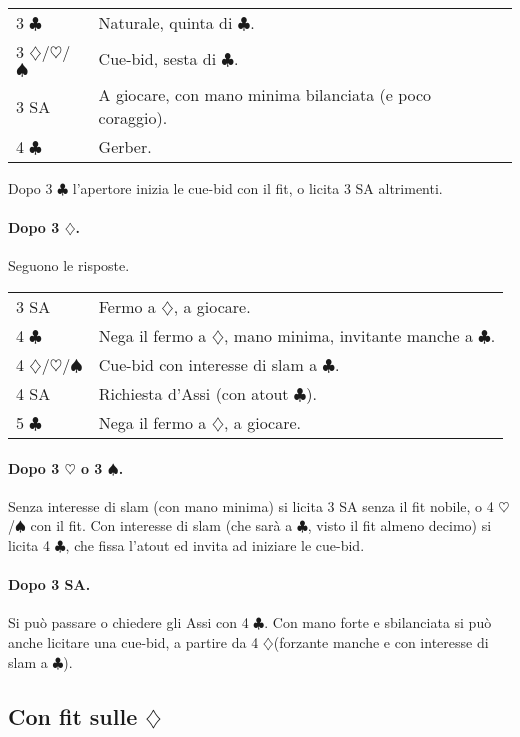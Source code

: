 \documentclass[a4paper,10pt]{article}
\renewcommand{\c}{$\clubsuit$\xspace}
\renewcommand{\d}{$\diamondsuit$\xspace}
\newcommand{\h}{$\heartsuit$\xspace}
\newcommand{\s}{$\spadesuit$\xspace}
\newcommand{\sa}{SA\xspace}
\newcommand{\smallspace}{\vskip0.3cm}
\newenvironment{twocol}
  {\smallspace\noindent\begin{tabular}{l p{0.78\textwidth}}}
  {\end{tabular}\smallspace}
\begin{document}
\begin{twocol}
	3 \c & Naturale, quinta di \c. \\
	3 \d/\h/\s & Cue-bid, sesta di \c. \\
	3 \sa & A giocare, con mano minima bilanciata (e poco coraggio). \\
	4 \c & Gerber.
\end{twocol}

Dopo 3 \c l'apertore inizia le cue-bid con il fit, o licita 3 \sa altrimenti. %

\paragraph{Dopo 3 \d.} Seguono le risposte.

\begin{twocol}
	3 \sa & Fermo a \d, a giocare. \\
	4 \c & Nega il fermo a \d, mano minima, invitante manche a \c. \\
	4 \d/\h/\s & Cue-bid con interesse di slam a \c. \\
	4 \sa & Richiesta d'Assi (con atout \c). \\
	5 \c & Nega il fermo a \d, a giocare.
\end{twocol}

\paragraph{Dopo 3 \h o 3 \s.} Senza interesse di slam (con mano minima) si licita 3 \sa senza il fit nobile, o 4 \h/\s con il fit. Con interesse di slam (che sarà a \c, visto il fit almeno decimo) si licita 4 \c, che fissa l'atout ed invita ad iniziare le cue-bid.

\paragraph{Dopo 3 \sa.} Si può passare o chiedere gli Assi con 4 \c. Con mano forte e sbilanciata si può anche licitare una cue-bid, a partire da 4 \d (forzante manche e con interesse di slam a \c).

\subsection{Con fit sulle \d}
\end{document}
